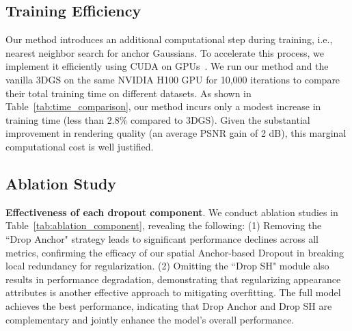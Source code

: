 \begin{table}[t]
  \centering
  \caption{\textbf{Ablation results of the designed components on the LLFF datasets (3 views).}}
  \resizebox{0.9\linewidth}{!}{
    
    }
\label{tab:ablation_component}
\end{table}

\begin{table}[ht]
\centering
\caption{\textbf{Ablation results of different SH Dropout strategies on the Blender dataset (8 views).}}
\label{tab:sh_ablation}
\end{table}



\subsection{Training Efficiency}
Our method introduces an additional computational step during training, i.e., nearest neighbor search for anchor Gaussians. To accelerate this process, we implement it efficiently using CUDA on GPUs~\cite{Garcia2010knn-cuda}.
%
We run our method and the vanilla 3DGS on the same NVIDIA H100 GPU for 10,000 iterations to compare their total training time on different datasets.
As shown in Table~\ref{tab:time_comparison}, our method incurs only a modest increase in training time (less than 2.8\% compared to 3DGS). Given the substantial improvement in rendering quality (an average PSNR gain of 2 dB), this marginal computational cost is well justified.



\subsection{Ablation Study}
\noindent\textbf{Effectiveness of each dropout component}. We conduct ablation studies in Table~\ref{tab:ablation_component}, revealing the following:  
(1) Removing the ``Drop Anchor" strategy leads to significant performance declines across all metrics, confirming the efficacy of our spatial Anchor-based Dropout in breaking local redundancy for regularization.
(2) Omitting the ``Drop SH" module also results in performance degradation, demonstrating that regularizing appearance attributes is another effective approach to mitigating overfitting.
%
The full model achieves the best performance, indicating that Drop Anchor and Drop SH are complementary and jointly enhance the model’s overall performance.

